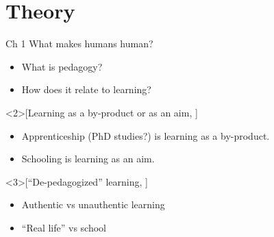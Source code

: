 \section{Theory}

\begin{frame}
\end{frame}

\begin{frame}
  \begin{block}{Ch 1 What makes humans human?}
    \begin{itemize}
      \item What is pedagogy?
      \item How does it relate to learning?
    \end{itemize}
  \end{block}

  \begin{example}<2>[Learning as a by-product or as an aim, 
    {\cite[pp.~9--10]{NecessaryConditionsOfLearning}}]
    \begin{itemize}
      \item Apprenticeship (PhD studies?) is learning as a by-product.
      \item Schooling is learning as an aim.
    \end{itemize}
  \end{example}

  \begin{example}<3>[\enquote{De-pedagogized} learning, 
    {\cite[pp.~11-12]{NecessaryConditionsOfLearning}}]
    \begin{itemize}
      \item Authentic vs unauthentic learning
      \item \enquote{Real life} vs school
    \end{itemize}
  \end{example}
\end{frame}

